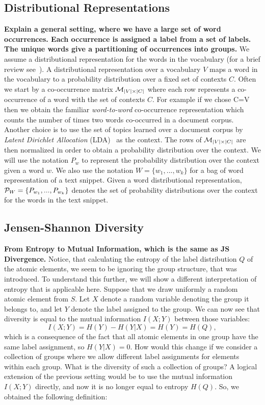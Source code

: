 \subsection{Distributional Representations}
\label{sec:distributional-representations}
{\bf Explain a general setting, where we have a large set of word
  occurrences. Each occurrence is assigned a label from a set of
  labels. The unique words give a partitioning of occurrences into groups.}
We assume a distributional representation for the words in the vocabulary (for a brief review
see~\cite{Turian10wordrepresentations}). A distributional representation over a vocabulary $V$ maps a word in the vocabulary to a 
probability distribution over a fixed set of contexts $C$. Often we start by a co-occurrence matrix ${\mathcal M}_{|V|\times|C|}$ where each row represents a co-occurrence of a word with the set of contexts
$C$. For example if we chose C=V then we obtain the familiar {\sl word-to-word} co-occurrence representation which counts the number
of times two words co-occurred in a document corpus. Another choice is to use the set of topics learned over a document
corpus by {\sl Latent Dirichlet Allocation} (LDA)~\cite{Blei:2003:LDA:944919.944937} as the context. The rows of ${\mathcal M}_{|V|\times|C|}$
are then normalized in order to obtain a probability distribution over the context. We will use the notation $P_w$ to represent
the probability distribution over the context  given a word $w$. We also use the notation $W=\{w_1,...,w_k\}$ for a bag of word representation of a text snippet. Given a word distributional representation, ${\mathcal P}_{W}=\{P_{w_1},...,P_{w_k}\}$ denotes the set of probability distributions over the context for the words
in the text snippet.


\subsection{Jensen-Shannon Diversity}
\label{sec:jensen-shannon-divergence}
{\bf From Entropy to Mutual Information, which is the same as JS
  Divergence. }
Notice, that calculating the entropy of the label
distribution $Q$ of the atomic elements, we seem to be ignoring the
group structure, that was introduced. To understand this further, we
will show a different interpretation of entropy that is applicable
here. Suppose that we draw uniformly a random atomic element from
$S$. Let $X$ denote a random variable denoting the group it belongs
to, and let $Y$ denote the label assigned to the group. We can now
see that diversity is equal to the mutual information $I(X;Y)$ between
those variables: 
\[I(X;Y)=H(Y)-H(Y|X) = H(Y)=H(Q),\]
which is a consequence of the fact that all atomic elements in one
group have the same label assignment, so $H(Y|X)=0$. How would this change if we consider a collection of
groups where we allow different label assignments for elements within
each group. What is the diversity of such a collection of groups? A
logical extension of the previous setting would be to use the mutual
information $I(X;Y)$ directly, and now it is no longer equal to entropy
$H(Q)$. So, we obtained the following definition:

